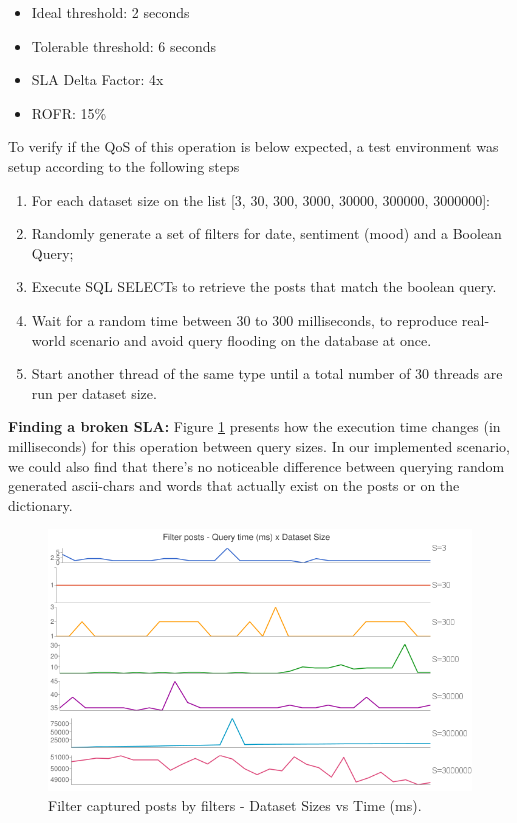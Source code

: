 \begin{itemize}
	\item{Ideal threshold: 2 seconds}
	\item{Tolerable threshold: 6 seconds}
	\item{SLA Delta Factor: 4x}
	\item{ROFR: 15\%}
\end{itemize}

To verify if the QoS of this operation is below expected, a test environment was setup according to the following steps

\begin{enumerate}
\item{For each dataset size on the list [3, 30, 300, 3000, 30000, 300000, 3000000]:}
\item{Randomly generate a set of filters for date, sentiment (mood) and a Boolean Query;}
\item{Execute SQL SELECTs to retrieve the posts that match the boolean query.}
\item{Wait for a random time between 30 to 300 milliseconds, to reproduce real-world scenario and avoid	query flooding on the database at once.}
\item{Start another thread of the same type until a total number of 30 threads are run per dataset size.}
\end{enumerate}


\textbf{Finding a broken SLA: }
Figure \ref{fig:filter-captured-posts-by-filters} presents how the execution time changes (in milliseconds) for this operation between query sizes. In our implemented scenario, we could also find that there's no noticeable difference between querying random generated ascii-chars and words that actually exist on the posts or on the dictionary.

\begin{figure}[ht!]
\centering
\includegraphics[width=120mm]{Imagens/filter-posts-query-time.png}
\caption{Filter captured posts by filters - Dataset Sizes vs Time (ms).\label{fig:filter-captured-posts-by-filters}}
\end{figure}

